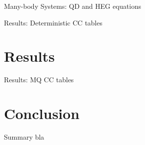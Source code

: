 \documentclass{beamer}
\begin{document}
	
  \begin{frame}{Many-body Systems: QD and HEG}
	equations
	\end{frame}
  \begin{frame}{Results: Deterministic CC}
	tables
	\end{frame}
\section{Results}
  \begin{frame}{Results: MQ CC}
	tables
	\end{frame}
\section{Conclusion}
  \begin{frame}{Summary}
	bla
	\end{frame}
\end{document}

